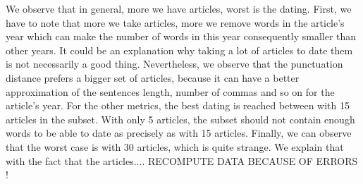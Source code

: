 We observe that in general, more we have articles, worst is the dating. First, we have to note that more we take articles, more we remove words in the article's year which can make the number of words in this year consequently smaller than other years. It could be an explanation why taking a lot of articles to date them is not necessarily a good thing. Nevertheless, we observe that the punctuation distance prefers a bigger set of articles, because it can have a better approximation of the sentences length, number of commas and so on for the article's year. For the other metrics, the best dating is reached between with 15 articles in the subset. With only 5 articles, the subset should not contain enough words to be able to date as precisely as with 15 articles. Finally, we can observe that the worst case is with 30 articles, which is quite strange. We explain that with the fact that the articles.... RECOMPUTE DATA BECAUSE OF ERRORS !

